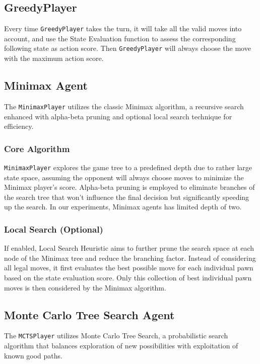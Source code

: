 \subsection{GreedyPlayer}
Every time \texttt{GreedyPlayer} takes the turn, it will take all the valid moves into account, and use the State Evaluation function to assess the corresponding following state as action score. Then \texttt{GreedyPlayer} will always choose the move with the maximum action score.

\subsection{Minimax Agent}
The \texttt{MinimaxPlayer} utilizes the classic Minimax algorithm, a recursive search enhanced with alpha-beta pruning and optional local search technique for efficiency.

\subsubsection{Core Algorithm}
\texttt{MinimaxPlayer} explores the game tree to a predefined depth due to rather large state space, assuming the opponent will always choose moves to minimize the Minimax player’s score. Alpha-beta pruning is employed to eliminate branches of the search tree that won't influence the final decision but significantly speeding up the search. In our experiments, Minimax agents has limited depth of two. 

\subsubsection{Local Search (Optional)}
If enabled, Local Search Heuristic aims to further prune the search space at each node of the Minimax tree and reduce the branching factor. Instead of considering all legal moves, it first evaluates the best possible move for each individual pawn based on the state evaluation score. Only this collection of best individual pawn moves is then considered by the Minimax algorithm. 


\subsection{Monte Carlo Tree Search Agent}
The \texttt{MCTSPlayer} utilizes Monte Carlo Tree Search\cite{DBLP:journals/corr/abs-2103-04931}, a probabilistic search algorithm that balances exploration of new possibilities with exploitation of known good paths.


